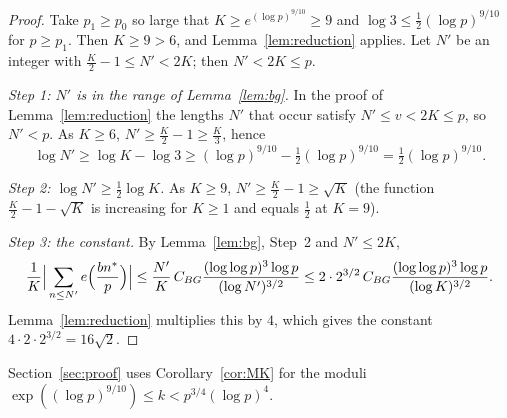 \begin{proof}
Take $p_1\ge p_0$ so large that $K\ge e^{(\log p)^{9/10}}\ge9$ and $\log3\le\frac12(\log p)^{9/10}$ for $p\ge p_1$. Then $K\ge9>6$, and Lemma~\ref{lem:reduction} applies. Let $N'$ be an integer with $\frac K2-1\le N'<2K$; then $N'<2K\le p$.

\emph{Step 1: $N'$ is in the range of Lemma~\ref{lem:bg}.} In the proof of Lemma~\ref{lem:reduction} the lengths $N'$ that occur satisfy $N'\le v<2K\le p$, so $N'<p$. As $K\ge6$, $N'\ge\frac K2-1\ge\frac K3$, hence
\[
\log N'\ge\log K-\log3\ge(\log p)^{9/10}-\tfrac12(\log p)^{9/10}=\tfrac12(\log p)^{9/10}.
\]

\emph{Step 2: $\log N'\ge\frac12\log K$.} As $K\ge9$, $N'\ge\frac K2-1\ge\sqrt K$ (the function $\frac K2-1-\sqrt K$ is increasing for $K\ge1$ and equals $\frac12$ at $K=9$).

\emph{Step 3: the constant.} By Lemma~\ref{lem:bg}, Step~2 and $N'\le2K$,
\[
\frac{1}{K}\Big|\sum_{n\le N'}e\Bigl(\frac{bn^*}{p}\Bigr)\Big|\le\frac{N'}{K}\,C_{BG}\frac{(\log\log p)^3\log p}{(\log N')^{3/2}}\le2\cdot2^{3/2}\,C_{BG}\frac{(\log\log p)^3\log p}{(\log K)^{3/2}}.
\]
Lemma~\ref{lem:reduction} multiplies this by $4$, which gives the constant $4\cdot2\cdot2^{3/2}=16\sqrt2$.
\end{proof}

Section~\ref{sec:proof} uses Corollary~\ref{cor:MK} for the moduli $\exp((\log p)^{9/10})\le k<p^{3/4}(\log p)^4$.

